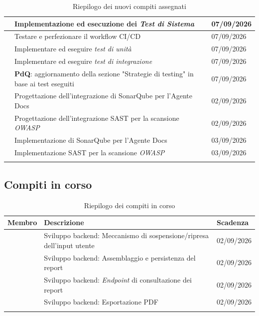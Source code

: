 \documentclass[12pt, a4paper]{article}
\begin{document}
\begin{xltabular}{\textwidth}{|l|X|l|}
         & Implementazione ed esecuzione dei \textit{Test di Sistema} & 07/09/2026 \\ \hline
         & Testare e perfezionare il workflow CI/CD & 07/09/2026 \\ \hline
         & Implementare ed eseguire \textit{test di unità} & 07/09/2026 \\ \hline
         & Implementare ed eseguire \textit{test di integrazione} & 07/09/2026 \\ \hline
         & \textbf{PdQ}: aggiornamento della sezione "Strategie di testing" in base ai test eseguiti & 07/09/2026 \\ \hline
         & Progettazione dell'integrazione di SonarQube per l'Agente Docs & 02/09/2026 \\ \hline
         & Progettazione dell'integrazione SAST per la scansione \textit{OWASP} & 02/09/2026 \\ \hline
         & Implementazione di SonarQube per l'Agente Docs & 03/09/2026 \\ \hline
         & Implementazione SAST per la scansione \textit{OWASP} & 03/09/2026 \\ \hline
        \caption{Riepilogo dei nuovi compiti assegnati}\label{tab:nuovi-compiti} \\
\end{xltabular}

\subsection{Compiti in corso}
\renewcommand{\arraystretch}{1.3}
\begin{xltabular}{\textwidth}{|l|X|l|}
    \hline
    \textbf{Membro} & \textbf{Descrizione} & \textbf{Scadenza} \\ \hline
    \endfirsthead
         & Sviluppo backend: Meccanismo di sospensione/ripresa dell'input utente & 02/09/2026 \\ \hline
         & Sviluppo backend: Assemblaggio e persistenza del report & 02/09/2026 \\ \hline
         & Sviluppo backend: \textit{Endpoint} di consultazione dei report & 02/09/2026 \\ \hline
         & Sviluppo backend: Esportazione PDF & 02/09/2026 \\ \hline
        \caption{Riepilogo dei compiti in corso}\label{tab:compiti-in-corso} \\
\end{xltabular}

\end{document}
